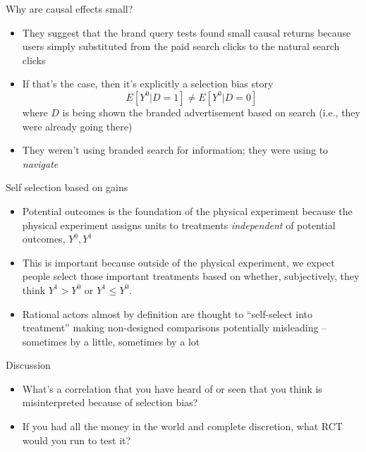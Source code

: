 \documentclass{beamer}
\begin{document}
\begin{frame}{Why are causal effects small?}

\begin{itemize}
\item They suggest that the brand query tests found small causal returns because users simply substituted from the paid search clicks to the natural search clicks
\item If that's the case, then it's explicitly a selection bias story $$E[Y^0|D=1] \neq E[Y^0|D=0]$$ where $D$ is being shown the branded advertisement based on search (i.e., they were already going there)
\item They weren't using branded search for information; they were using to \emph{navigate}
\end{itemize}

\end{frame}

\begin{frame}{Self selection based on gains}

\begin{itemize}
\item Potential outcomes is the foundation of the physical experiment because the physical experiment assigns units to treatments \emph{independent} of potential outcomes, $Y^0,Y^1$
\item This is important because outside of the physical experiment, we expect people select those important treatments based on whether, subjectively, they think $Y^1>Y^0$ or $Y^1\leq Y^0$. 
\item Rational actors almost by definition are thought to ``self-select into treatment'' making non-designed comparisons potentially misleading -- sometimes by a little, sometimes by a lot
\end{itemize}

\end{frame}


\begin{frame}{Discussion}

\begin{itemize}
\item What's a correlation that you have heard of or seen that you think is misinterpreted because of selection bias?
\item If you had all the money in the world and complete discretion, what RCT would you run to test it?
\end{itemize}

\end{frame}
\end{document}
